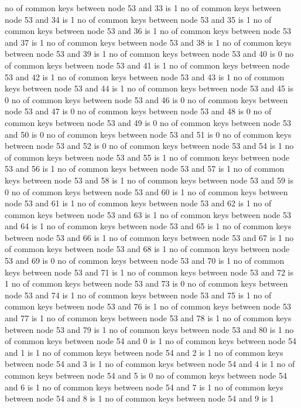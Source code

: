 no of common keys between node 53 and 33 is 1
no of common keys between node 53 and 34 is 1
no of common keys between node 53 and 35 is 1
no of common keys between node 53 and 36 is 1
no of common keys between node 53 and 37 is 1
no of common keys between node 53 and 38 is 1
no of common keys between node 53 and 39 is 1
no of common keys between node 53 and 40 is 0
no of common keys between node 53 and 41 is 1
no of common keys between node 53 and 42 is 1
no of common keys between node 53 and 43 is 1
no of common keys between node 53 and 44 is 1
no of common keys between node 53 and 45 is 0
no of common keys between node 53 and 46 is 0
no of common keys between node 53 and 47 is 0
no of common keys between node 53 and 48 is 0
no of common keys between node 53 and 49 is 0
no of common keys between node 53 and 50 is 0
no of common keys between node 53 and 51 is 0
no of common keys between node 53 and 52 is 0
no of common keys between node 53 and 54 is 1
no of common keys between node 53 and 55 is 1
no of common keys between node 53 and 56 is 1
no of common keys between node 53 and 57 is 1
no of common keys between node 53 and 58 is 1
no of common keys between node 53 and 59 is 0
no of common keys between node 53 and 60 is 1
no of common keys between node 53 and 61 is 1
no of common keys between node 53 and 62 is 1
no of common keys between node 53 and 63 is 1
no of common keys between node 53 and 64 is 1
no of common keys between node 53 and 65 is 1
no of common keys between node 53 and 66 is 1
no of common keys between node 53 and 67 is 1
no of common keys between node 53 and 68 is 1
no of common keys between node 53 and 69 is 0
no of common keys between node 53 and 70 is 1
no of common keys between node 53 and 71 is 1
no of common keys between node 53 and 72 is 1
no of common keys between node 53 and 73 is 0
no of common keys between node 53 and 74 is 1
no of common keys between node 53 and 75 is 1
no of common keys between node 53 and 76 is 1
no of common keys between node 53 and 77 is 1
no of common keys between node 53 and 78 is 1
no of common keys between node 53 and 79 is 1
no of common keys between node 53 and 80 is 1
no of common keys between node 54 and 0 is 1
no of common keys between node 54 and 1 is 1
no of common keys between node 54 and 2 is 1
no of common keys between node 54 and 3 is 1
no of common keys between node 54 and 4 is 1
no of common keys between node 54 and 5 is 0
no of common keys between node 54 and 6 is 1
no of common keys between node 54 and 7 is 1
no of common keys between node 54 and 8 is 1
no of common keys between node 54 and 9 is 1
